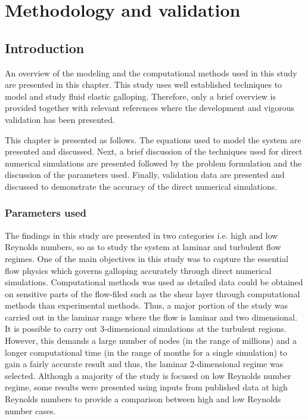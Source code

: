 
\chapter{Methodology and validation}

\section{Introduction}
 
An overview of the modeling and the computational methods used in this study are presented in this chapter. This study uses well established techniques to model and study fluid elastic galloping. Therefore, only a brief overview is provided together with relevant references where the development and vigorous validation has been presented.  

This chapter is presented as follows. The equations used to model the system are presented and discussed. Next, a brief discussion of the techniques used for direct numerical simulations are presented followed by the problem formulation and the discussion of the parameters used. Finally, validation data are presented and discussed to demonstrate the accuracy of the direct numerical simulations.


\subsection{Parameters used}

The findings in this study are presented in two categories i.e. high and low Reynolds numbers, so as to study the system at laminar and turbulent flow regimes. One of the main objectives in this study was to capture the essential flow physics which governs galloping accurately through direct numerical simulations. Computational methods was used as detailed data could be obtained on sensitive parts of the flow-filed such as the shear layer through computational methods than experimental methods. Thus, a major portion of the study was carried out in the laminar range where the flow is laminar and two dimensional. It is possible to carry out 3-dimensional simulations at the turbulent regions. However, this demands a large number of nodes (in the range of millions) and a longer computational time (in the range of months for a single simulation) to gain a fairly accurate result and thus, the laminar 2-dimensional regime was selected.  Although a majority of the study is focused on low Reynolds number regime, some results were presented using inputs from published data at high Reynolds numbers to provide a comparison between high and low Reynolds number cases. 

